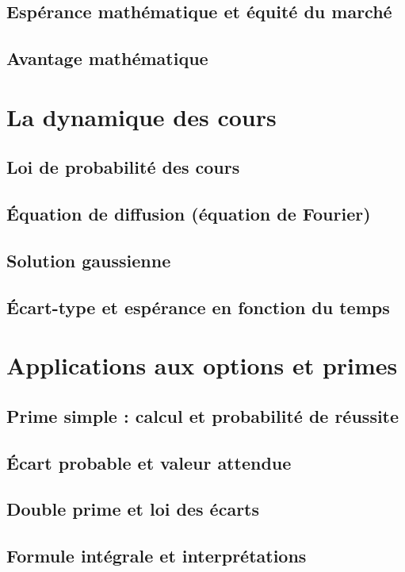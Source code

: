 \documentclass[12pt,a4paper]{article}
\begin{document}
\subsection{Espérance mathématique et équité du marché}
\subsection{Avantage mathématique}

\section{La dynamique des cours}
\subsection{Loi de probabilité des cours}
\subsection{Équation de diffusion (équation de Fourier)}
\subsection{Solution gaussienne}
\subsection{Écart-type et espérance en fonction du temps}

\section{Applications aux options et primes}
\subsection{Prime simple : calcul et probabilité de réussite}
\subsection{Écart probable et valeur attendue}
\subsection{Double prime et loi des écarts}
\subsection{Formule intégrale et interprétations}
\end{document}
